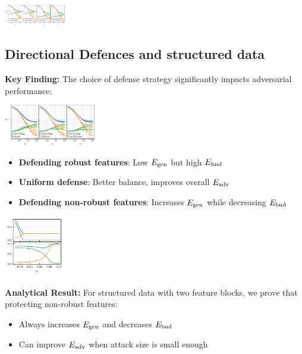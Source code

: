 \documentclass[a0paper,fleqn]{betterportraitposter}
\theoremstyle{plain}
\theoremstyle{definition}
\theoremstyle{remark}
\begin{document}
{\begin{multicols}{3}
\includegraphics[width=0.2\textwidth]{Assets/feature_combinations_alpha_sweep.pdf}

\subsection{Directional Defences and structured data}

\textbf{Key Finding:} The choice of defense strategy significantly impacts adversarial performance:

\begin{center}
\includegraphics[width=0.3\textwidth]{Assets/defence_sweep.pdf}
\end{center}

\begin{itemize}
    \item \textbf{Defending robust features}: Low $E_{\mathrm{gen}}$ but high $E_{\mathrm{bnd}}$
    \item \textbf{Uniform defense}: Better balance, improves overall $E_{\mathrm{adv}}$
    \item \textbf{Defending non-robust features}: Increases $E_{\mathrm{gen}}$ while decreasing $E_{\mathrm{bnd}}$
\end{itemize}

\begin{center}
\includegraphics[width=0.2\textwidth]{Assets/optimal_defense.pdf}
\end{center}

\textbf{Analytical Result:} For structured data with two feature blocks, we prove that protecting non-robust features:
\begin{itemize}
    \item Always increases $E_{\mathrm{gen}}$ and decreases $E_{\mathrm{bnd}}$
    \item Can improve $E_{\mathrm{adv}}$ when attack size is small enough
\end{itemize}


\end{multicols}}
\end{document}
